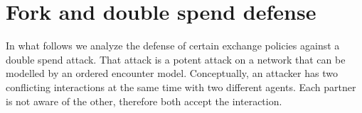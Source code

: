 






\section{Fork and double spend defense}
\label{sec:model_double_spend}
In what follows we analyze the defense of certain exchange policies against a double spend attack. 
That attack is a potent attack on a network that can be modelled by an ordered encounter model. 
Conceptually, an attacker 
has two conflicting interactions at the same time with two different agents. Each partner is not
aware of the other, therefore both accept the interaction. 

